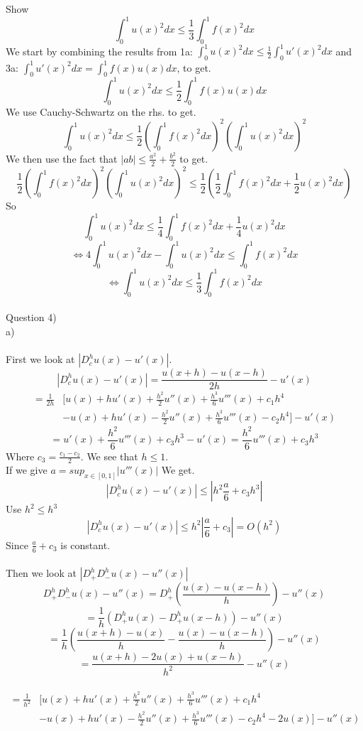 \documentclass[12pt, letterpaper, twoside]{article}
\begin{document}
Show
$$
\int_0^1 u(x)^2 dx \leq \frac{1}{3} \int_0^1 f(x)^2 dx
$$
We start by combining the results from 1a: $\int_0^1 u(x)^2 dx \leq \frac{1}{2} \int_0^1 u'(x)^2 dx$ and 3a: $\int_0^1 u'(x)^2 dx = \int_0^1 f(x)u(x) dx$, to get.
$$
\int_0^1 u(x)^2 dx \leq \frac{1}{2} \int_0^1 f(x)u(x) dx
$$
We use Cauchy-Schwartz on the rhs. to get.
$$
\int_0^1 u(x)^2 dx \leq \frac{1}{2} \left( \int_0^1 f(x)^2 dx \right)^2 \left( \int_0^1 u(x)^2 dx \right)^2
$$
We then use the fact that $|ab| \leq \frac{a^2}{2} + \frac{b^2}{2}$ to get.
$$
\frac{1}{2} \left( \int_0^1 f(x)^2 dx \right)^2 \left( \int_0^1 u(x)^2 dx \right)^2
\leq
\frac{1}{2} \left( \frac{1}{2} \int_0^1 f(x)^2 dx + \frac{1}{2} u(x)^2 dx \right)
$$
So
$$
\int_0^1 u(x)^2 dx \leq \frac{1}{4} \int_0^1 f(x)^2 dx + \frac{1}{4} u(x)^2 dx
$$
$$
\iff 4\int_0^1 u(x)^2 dx - \int_0^1 u(x)^2 dx \leq \int_0^1 f(x)^2 dx
$$
$$
\iff \int_0^1 u(x)^2 dx \leq \frac{1}{3} \int_0^1 f(x)^2 dx
$$
\newpage
\ \\
Question 4)\\
a)\\
\ \\
First we look at $|D_c^h u(x) - u'(x)|$.
$$
|D_c^h u(x) - u'(x)| = \frac{u(x+h) - u(x-h)}{2h} - u'(x)
$$
\begin{align}
=\frac{1}{2h} &[u(x) + hu'(x) + \frac{h^2}{2} u''(x) + \frac{h^3}{6} u'''(x) + c_1 h^4 \nonumber \\
              & -u(x) + hu'(x) - \frac{h^2}{2} u''(x) + \frac{h^3}{6} u'''(x) - c_2 h^4 ] - u'(x) \nonumber
\end{align}
$$
= u'(x) + \frac{h^2}{6} u'''(x) + c_3h^3 - u'(x)  =  \frac{h^2}{6} u'''(x) + c_3h^3
$$
Where $c_3 = \frac{c_1 - c_2}{2}$.
We see that $h \leq 1$.\\
If we give
$
a = sup_{x \in [0,1]} |u'''(x)|
$
We get.
$$
|D_c^h u(x) - u'(x)| \leq |h^2 \frac{a}{6} + c_3 h^3|
$$
Use $h^2 \leq h^3$
$$
|D_c^h u(x) - u'(x)| \leq h^2 |\frac{a}{6} + c_3| = O(h^2)
$$
Since $\frac{a}{6} + c_3$ is constant.\\
\ \\
Then we look at $|D_+^h D_-^h u(x) - u''(x)|$
$$
D_+^h D_-^h u(x) - u''(x)
=
D_+^h \left( \frac{u(x) - u(x-h)}{h} \right) - u''(x)
$$
$$
= \frac{1}{h} \left( D_+^h u(x) - D_+^h u(x-h) \right) - u''(x)
$$
$$
= \frac{1}{h} \left( \frac{u(x+h) - u(x)}{h} - \frac{u(x) - u(x - h)}{h} \right) - u''(x)
$$
$$
= \frac{u(x+h) -2u(x) + u(x-h)}{h^2} - u''(x)
$$
\newpage
\ \\
\begin{align}
= \frac{1}{h^2} &[u(x) + hu'(x) + \frac{h^2}{2} u''(x) + \frac{h^3}{6} u'''(x) + c_1h^4 \nonumber \\
                &-u(x) + hu'(x) - \frac{h^2}{2} u''(x) + \frac{h^3}{6} u'''(x) - c_2h^4 - 2u(x)] \nonumber
                - u''(x)
\end{align}
\end{document}

